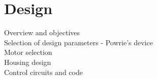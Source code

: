 \chapter{Design}

Overview and objectives\\
Selection of design parameters - Powrie's device\\
Motor selection\\
Housing design\\
Control circuits and code\\
